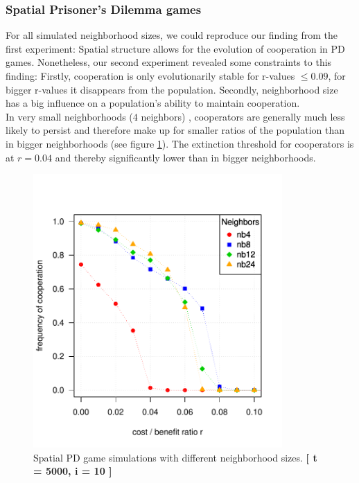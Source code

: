 \subsubsection*{Spatial Prisoner's Dilemma games}
For all simulated neighborhood sizes, we could reproduce our finding from the first experiment: Spatial structure allows for the evolution of cooperation in PD games. Nonetheless, our second experiment revealed some constraints to this finding: Firstly, cooperation is only evolutionarily stable for r-values $ \leq 0.09$, for bigger r-values it disappears from the population. Secondly, neighborhood size has a big influence on a population's ability to maintain cooperation.\\
In very small neighborhoods ($4$ neighbors) , cooperators are generally much less likely to persist and therefore make up for smaller ratios of the population than in bigger neighborhoods (see figure \ref{fig: task2_multiplot}). The extinction threshold for cooperators is at $r=0.04$ and thereby significantly lower than in bigger neighborhoods. 

\begin{figure}[H]
	\centering 
	\includegraphics[width=9.5cm]{task2_multiplot}
	\caption{Spatial PD game simulations with different neighborhood sizes.  \textbf{[ t = 5000, i = 10 ]} }\label{fig: task2_multiplot}
\end{figure}
 
